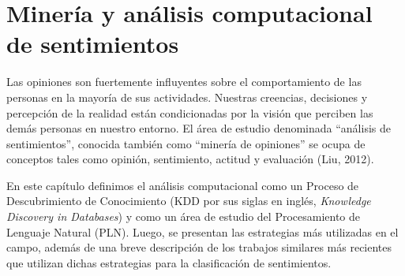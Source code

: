 \chapter {Miner\'ia y an\'alisis computacional de sentimientos}\label{Mineria}

Las opiniones son fuertemente influyentes sobre el comportamiento de las personas en la mayor\'ia de sus actividades. Nuestras creencias, decisiones y percepci\'on de la realidad est\'an condicionadas por la visi\'on que perciben las dem\'as personas en nuestro entorno. El \'area de estudio denominada ``an\'alisis de sentimientos'', conocida tambi\'en como ``miner\'ia de opiniones'' se ocupa de conceptos tales como opini\'on, sentimiento, actitud y evaluaci\'on (Liu, 2012).
\newline

En este cap\'itulo definimos el an\'alisis computacional como un Proceso de Descubrimiento de Conocimiento (KDD por sus siglas en ingl\'es, \textit{Knowledge Discovery in Databases}) y como un \'area de estudio del Procesamiento de Lenguaje Natural (PLN). Luego, se presentan las estrategias m\'as utilizadas en el campo, adem\'as de una breve descripci\'on de los trabajos similares m\'as recientes que utilizan dichas estrategias para la clasificaci\'on de sentimientos.

